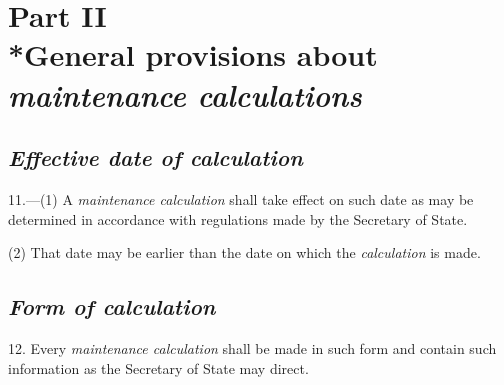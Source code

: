 \documentclass[12pt,a4paper]{article}
\begin{document}
\section[Part II --- General provisions about 
\emph{maintenance calculations}  %
]{\sloppy Part II\\*General provisions about 
\emph{maintenance calculations}  %
}

\renewcommand\parthead{--- Schedule 1 Part II}

\subsection*{\itshape Effective date of 
\emph{calculation}  %
}

11.---(1) A 
\emph{maintenance calculation}  %
shall take effect on such date as may be determined in accordance with regulations made by the Secretary of State.

(2) That date may be earlier than the date on which the 
\emph{calculation}  %
is made.


\subsection*{\itshape Form of 
\emph{calculation}  %
}

12. Every 
\emph{maintenance calculation}  %
shall be made in such form and contain such information as the 
Secretary of State  %
may direct.

\end{document}
